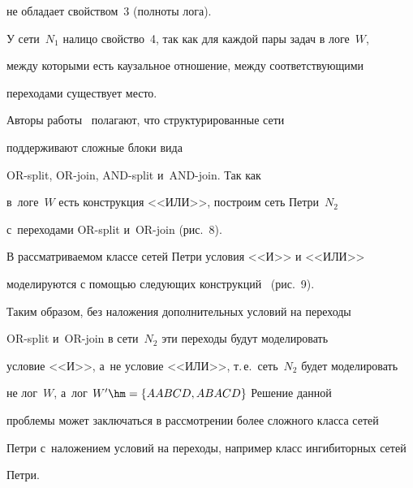не обладает свойством~3 (полноты лога).

  

  У сети~$N_1$ налицо свойство~4, так как для каждой пары задач в логе~$W$, 

между которыми есть каузальное отношение, между соответствующими 

переходами существует место.

  

  Авторы работы~\cite{5-tg} полагают, что структурированные сети 

поддерживают сложные блоки вида 

  {OR-split}, {OR-join}, {AND-split} и~{AND-join}. Так как 

  в~логе~$W$ есть конструкция <<ИЛИ>>, построим сеть Петри~$N_2$ 

с~переходами {OR-split} и~{OR-join} (рис.~8).



  В рассматриваемом классе сетей Петри условия <<И>> и <<ИЛИ>> 

моделируются с помощью следующих конструкций~\cite{7-tg} (рис.~9).



  

  Таким образом, без наложения дополнительных условий на переходы 

\mbox{OR-split} и~{OR-join} в сети~$N_2$ эти переходы будут моделировать 

условие <<И>>, а~не условие <<ИЛИ>>, т.\,е.\ сеть~$N_2$ будет моделировать 

не лог~$W$, а~лог $W^\prime\hm= \{ AABCD, ABACD\}$ Решение данной 

проблемы может заключаться в рас\-смот\-ре\-нии более сложного класса сетей 

Петри с~наложением условий на переходы, например класс ингибиторных сетей 

Петри.

  


